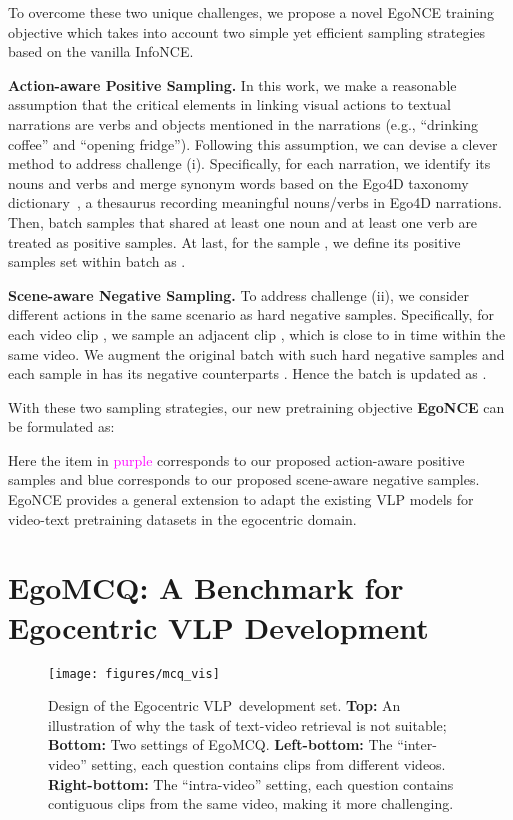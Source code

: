 \documentclass{article}
\newcommand{\vlp}{Egocentric VLP}
\newcommand{\model}{EgoNCE\xspace}
\newcommand{\eval}{EgoMCQ}
\begin{document}
To overcome these two unique challenges, we propose a novel EgoNCE training objective which takes into account two simple yet efficient sampling strategies based on the vanilla InfoNCE.

\textbf{Action-aware Positive Sampling.}  
In this work, we make a reasonable assumption that the critical elements in linking visual actions to textual narrations are verbs and objects mentioned in the narrations (e.g., ``drinking coffee'' and ``opening fridge''). Following this assumption, we can devise a clever method to address challenge (i). 
Specifically, for each narration, we identify its nouns and verbs and merge synonym words based on the Ego4D taxonomy dictionary~\cite{grauman2021ego4d}, a thesaurus recording meaningful nouns/verbs in Ego4D narrations.
Then, batch samples that shared at least one noun and at least one verb are treated as positive samples.
At last, for the sample , we define its positive samples set within batch 
 as .

\textbf{Scene-aware Negative Sampling.}
To address challenge (ii), we consider different actions in the same scenario as hard negative samples.
Specifically, for each video clip , we sample an adjacent clip , which is close to  in time within the same video. 
We augment the original batch  with such hard negative samples and each sample  in  has its negative counterparts .
Hence the batch is updated as . 

With these two sampling strategies, our new pretraining objective \textbf{\model} can be formulated as:

Here the item in \textcolor{Fuchsia}{purple} corresponds to our proposed action-aware positive samples and \textcolor{citecolor}{blue} corresponds to our proposed scene-aware negative samples.
\model provides a general extension to adapt the existing VLP models for  video-text pretraining datasets in the egocentric domain. \section{\eval: A Benchmark for \vlp{} Development}

\begin{figure}[!t]
	\centering
	\texttt{[image: figures/mcq\_vis]}
	\vspace{-1.5em}
\caption{
	Design of the \vlp~development set.
	\textbf{Top:} 
	An illustration of why the task of text-video retrieval is not suitable;
	\textbf{Bottom:} Two settings of EgoMCQ. 
	\textbf{Left-bottom:} The ``inter-video'' setting, each question contains  clips from different videos.
	\textbf{Right-bottom:} The ``intra-video'' setting, each question contains  contiguous clips from the same video, making it more challenging.} 
	\label{egomcq}
\vspace{-1.5em}
\end{figure}
\end{document}
